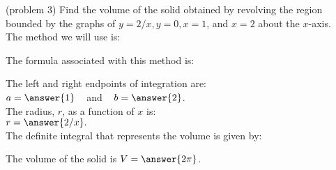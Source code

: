 \documentclass{ximera}
\begin{document}
\begin{problem}(problem 3)
Find the volume of the solid obtained by revolving the region bounded by the graphs of $y = 2/x, y = 0, x = 1$, and $x = 2$ about the $x$-axis.\\
The method we will use is:
\begin{multipleChoice}
\end{multipleChoice}

The formula associated with this method is:
\begin{multipleChoice}
\end{multipleChoice}

The left and right endpoints of integration are:\\
$a = \answer{1}\;\;\;$ and $\;\;\; b = \answer{2}$.\\
The radius, $r$, as a function of $x$ is:\\
$r = \answer{2/x}.$\\

The definite integral that represents the volume is given by:\\
\begin{multipleChoice}
\end{multipleChoice}

The volume of the solid is $V = \answer{2\pi}$.

\end{problem}
\end{document}
